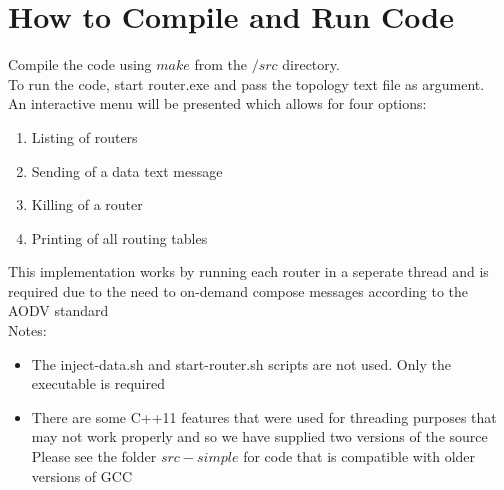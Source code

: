 \documentclass[12pt, titlepage]{article}
\begin{document}
\section{How to Compile and Run Code}

Compile the code using $make$ from the $/src$ directory. \\
To run the code, start router.exe and pass the topology text file as argument. \\
An interactive menu will be presented which allows for four options: 
    \begin{enumerate}
        \item Listing of routers
        \item Sending of a data text message
        \item Killing of a router
        \item Printing of all routing tables
    \end{enumerate} 
This implementation works by running each router in a seperate thread and is required due to the need to on-demand compose messages according to the AODV standard \\

Notes:
\begin{itemize}
\item The inject-data.sh and start-router.sh scripts are not used. Only the executable is required
\item There are some C++11 features that were used for threading purposes that may not work properly and so we have supplied two versions of the source
          Please see the folder $src-simple$ for code that is compatible with older versions of GCC
\end{itemize}
\end{document}
